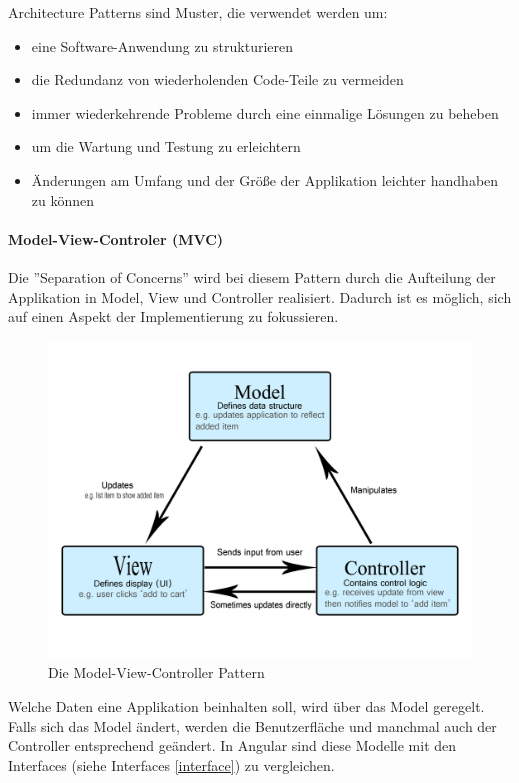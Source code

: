 Architecture Patterns sind Muster, die verwendet werden um:
\begin{itemize}
  \item eine Software-Anwendung zu strukturieren
  \item die Redundanz von wiederholenden Code-Teile zu vermeiden 
  \item immer wiederkehrende Probleme durch eine einmalige Lösungen zu beheben
  \item um die Wartung und Testung zu erleichtern
  \item Änderungen am Umfang und der Größe der Applikation leichter handhaben zu können
\end{itemize} \cite{MVCmdn, MVVM, MVC}

\paragraph{Model-View-Controler (MVC)}
Die ”Separation of Concerns” wird bei diesem Pattern durch die Aufteilung der Applikation in Model, View und Controller realisiert. Dadurch ist es möglich, sich auf einen Aspekt der Implementierung zu fokussieren. 

\begin{figure} [h t]
  \centering
  \includegraphics[scale=0.5]{pics/mvc.png}
  \caption{Die Model-View-Controller Pattern \cite{MVCmdn}}
  \label{fig:tech:front:mvc-architecture}
\end{figure}

Welche Daten eine Applikation beinhalten soll, wird über das Model geregelt. Falls sich das Model ändert, werden die Benutzerfläche und manchmal auch der Controller entsprechend geändert. In Angular sind diese Modelle mit den Interfaces (siehe Interfaces \ref{interface})  zu vergleichen.


